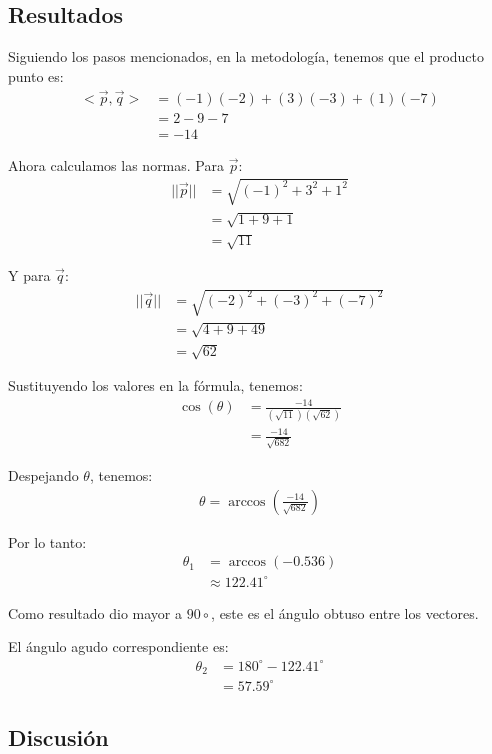 \documentclass{article}
\begin{document}
\subsection{Resultados}
\setcounter{equation}{0}

Siguiendo los pasos mencionados, en la metodología, tenemos que el producto punto es:
\begin{align}
<\vec{p},\vec{q}> &= (-1)(-2) + (3)(-3) + (1)(-7) \\
&= 2 - 9 - 7 \\
&= -14
\end{align}

Ahora calculamos las normas.
Para $\vec{p}$:
\begin{align}
||\vec{p}|| &= \sqrt{(-1)^2 + 3^2 + 1^2} \\
&= \sqrt{1 + 9 + 1} \\
&= \sqrt{11}
\end{align}

Y para $\vec{q}$:
\begin{align}
||\vec{q}|| &= \sqrt{(-2)^2 + (-3)^2 + (-7)^2} \\
&= \sqrt{4 + 9 + 49} \\
&= \sqrt{62}
\end{align}

Sustituyendo los valores en la fórmula, tenemos:
\begin{align}
\cos(\theta) &= \frac{-14}{(\sqrt{11}) (\sqrt{62})} \\
&= \frac{-14}{\sqrt{682}} 
\end{align}

Despejando $\theta$, tenemos:
\begin{align}
\theta = \arccos(\frac{-14}{\sqrt{682}}) 
\end{align}

Por lo tanto:
\begin{align}
\theta_1 &= \arccos(-0.536) \\
&\approx 122.41^\circ
\end{align}

Como resultado dio mayor a $90\circ$, este es el ángulo obtuso entre los vectores.

El ángulo agudo correspondiente es:
\begin{align}
\theta_2 &= 180^\circ - 122.41^\circ \\
&= 57.59^\circ
\end{align}

\subsection{Discusión}
\end{document}
